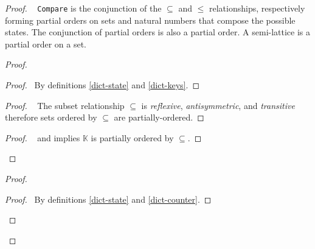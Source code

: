 \documentclass[11pt, oneside]{article}   	%
\begin{document}
\begin{proof}
		\pfsketch~ \texttt{Compare} is the conjunction of the $\subseteq$ and $\leq$ relationships, respectively forming partial orders on sets and natural numbers that compose the possible states. The conjunction of partial orders is also a partial order. A semi-lattice is a partial order on a set.
		\begin{proof}
		
			\begin{proof}
				\pf~By definitions \ref{dict-state} and \ref{dict-keys}.
			\end{proof}
			
			\begin{proof}
				\pf~ The subset relationship $\subseteq$ is \textit{reflexive}, \textit{antisymmetric}, and \textit{transitive} therefore sets ordered by $\subseteq$ are partially-ordered.
			\end{proof}
			
			\qedstep
			 \begin{proof}
			  	\pf~ and  implies $\mathds{K}$ is partially ordered by $\subseteq$.
			\end{proof}
		\end{proof}
		
		\begin{proof}
		
			\begin{proof}
				\pf~By definitions \ref{dict-state} and \ref{dict-counter}.
			\end{proof}
			

\end{proof}
\end{proof}
\end{document}
